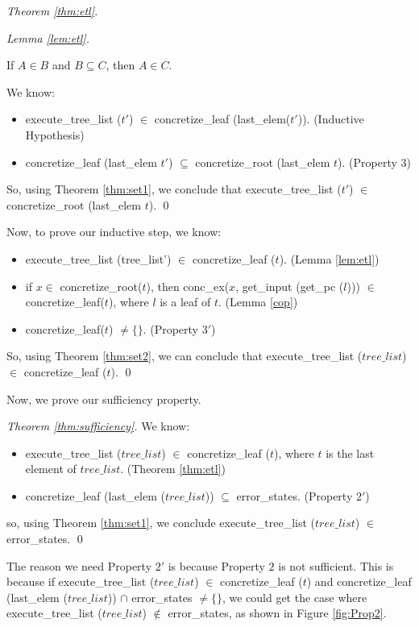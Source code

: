 \begin{proof}[Theorem \ref{thm:etl}]
\begin{proof}[Lemma \ref{lem:etl}]
\begin{theorem} \label{thm:set1}
If $A \in B$ and $B \subseteq C$, then $A \in C$.
\end{theorem}

We know:
\begin{itemize}
\item execute\_tree\_list ($t'$) $\in$
        concretize\_leaf (last\_elem($t'$)). (Inductive Hypothesis)
\item 
concretize\_leaf (last\_elem $t'$) $\subseteq$ concretize\_root (last\_elem $t$). (Property $3$)
 \end{itemize}
 
 So, using Theorem \ref{thm:set1}, we conclude that execute\_tree\_list ($t'$) $\in$ concretize\_root (last\_elem $t$). \qed
\end{proof}

Now, to prove our inductive step, we know:
\begin{itemize}
\item execute\_tree\_list (tree\_list') $\in$ concretize\_leaf ($t$). (Lemma \ref{lem:etl})
\item if $x \in$ concretize\_root($t$), then  conc\_ex($x$, get\_input (get\_pc ($l$))) $\in$ concretize\_leaf($t$),
where $l$ is a leaf of $t$. (Lemma \ref{cop})
\item concretize\_leaf($t$) $\neq \{\} $. (Property $3'$)
\end{itemize}

So, using Theorem \ref{thm:set2}, we can conclude that execute\_tree\_list ($tree\_list$) $\in$ concretize\_leaf ($t$). \qed
\end{proof}

Now, we prove our sufficiency property.

\begin{proof}[Theorem \ref{thm:sufficiency}]
We know:
\begin{itemize}
\item execute\_tree\_list ($tree\_list$) $\in$ concretize\_leaf ($t$), where $t$ is the last element of $tree\_list$. (Theorem \ref{thm:etl})
\item concretize\_leaf (last\_elem ($tree\_list$)) $\subseteq$ error\_states. (Property $2'$)
\end{itemize}
so, using Theorem \ref{thm:set1}, we conclude
execute\_tree\_list ($tree\_list$) $\in$ error\_states. \qed
\end{proof}

The reason we need Property $2'$ is because Property $2$ is not sufficient. This is because if execute\_tree\_list ($tree\_list$) $\in$ concretize\_leaf ($t$) and concretize\_leaf (last\_elem ($tree\_list$)) $\cap$ error\_states $\neq \{\}$, we could get the case where
execute\_tree\_list ($tree\_list$) $\notin$ error\_states, as shown in Figure \ref{fig:Prop2}.

